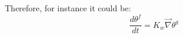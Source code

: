 Therefore, for instance it could be:
\begin{equation}
\frac{d \theta^f}{dt} = K_w \vec{\nabla}{\theta^g }
\end{equation}